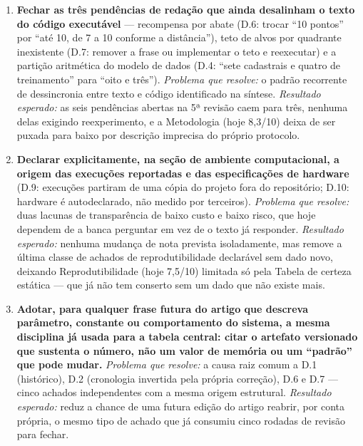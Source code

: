 \documentclass[11pt,a4paper]{article}
\begin{document}
\begin{enumerate}[leftmargin=1.4em,itemsep=0.5em]
  \item \textbf{Fechar as três pendências de redação que ainda desalinham o texto do código
  executável} --- recompensa por abate (D.6: trocar ``10 pontos'' por ``até 10, de 7 a 10 conforme a
  distância''), teto de alvos por quadrante inexistente (D.7: remover a frase ou implementar o teto e
  reexecutar) e a partição aritmética do modelo de dados (D.4: ``sete cadastrais e quatro de
  treinamento'' para ``oito e três''). \emph{Problema que resolve:} o padrão recorrente de
  dessincronia entre texto e código identificado na síntese. \emph{Resultado esperado:} as seis
  pendências abertas na 5ª revisão caem para três, nenhuma delas exigindo reexperimento, e a
  Metodologia (hoje 8,3/10) deixa de ser puxada para baixo por descrição imprecisa do próprio
  protocolo.

  \item \textbf{Declarar explicitamente, na seção de ambiente computacional, a origem das execuções
  reportadas e das especificações de hardware} (D.9: execuções partiram de uma cópia do projeto fora
  do repositório; D.10: hardware é autodeclarado, não medido por terceiros). \emph{Problema que
  resolve:} duas lacunas de transparência de baixo custo e baixo risco, que hoje dependem de a banca
  perguntar em vez de o texto já responder. \emph{Resultado esperado:} nenhuma mudança de nota
  prevista isoladamente, mas remove a última classe de achados de reprodutibilidade declarável sem
  dado novo, deixando Reprodutibilidade (hoje 7,5/10) limitada só pela Tabela de certeza estática ---
  que já não tem conserto sem um dado que não existe mais.

  \item \textbf{Adotar, para qualquer frase futura do artigo que descreva parâmetro, constante ou
  comportamento do sistema, a mesma disciplina já usada para a tabela central: citar o artefato
  versionado que sustenta o número, não um valor de memória ou um ``padrão'' que pode mudar.}
  \emph{Problema que resolve:} a causa raiz comum a D.1 (histórico), D.2 (cronologia invertida pela
  própria correção), D.6 e D.7 --- cinco achados independentes com a mesma origem estrutural.
  \emph{Resultado esperado:} reduz a chance de uma futura edição do artigo reabrir, por conta
  própria, o mesmo tipo de achado que já consumiu cinco rodadas de revisão para fechar.
\end{enumerate}
\end{document}
